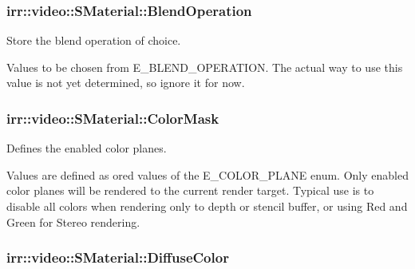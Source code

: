\subsubsection[{\texorpdfstring{Blend\+Operation}{BlendOperation}}]{ irr\+::video\+::\+S\+Material\+::\+Blend\+Operation}\hypertarget{classirr_1_1video_1_1SMaterial_afbef5b333fd3af57649cf11ab575fa26}{}\label{classirr_1_1video_1_1SMaterial_afbef5b333fd3af57649cf11ab575fa26}


Store the blend operation of choice. 

Values to be chosen from E\+\_\+\+B\+L\+E\+N\+D\+\_\+\+O\+P\+E\+R\+A\+T\+I\+ON. The actual way to use this value is not yet determined, so ignore it for now. 
\subsubsection[{\texorpdfstring{Color\+Mask}{ColorMask}}]{ irr\+::video\+::\+S\+Material\+::\+Color\+Mask}\hypertarget{classirr_1_1video_1_1SMaterial_a5a4833b515b453c592224d89356dbc01}{}\label{classirr_1_1video_1_1SMaterial_a5a4833b515b453c592224d89356dbc01}


Defines the enabled color planes. 

Values are defined as or\textquotesingle{}ed values of the E\+\_\+\+C\+O\+L\+O\+R\+\_\+\+P\+L\+A\+NE enum. Only enabled color planes will be rendered to the current render target. Typical use is to disable all colors when rendering only to depth or stencil buffer, or using Red and Green for Stereo rendering. 
\subsubsection[{\texorpdfstring{Diffuse\+Color}{DiffuseColor}}]{ irr\+::video\+::\+S\+Material\+::\+Diffuse\+Color}\hypertarget{classirr_1_1video_1_1SMaterial_ac4e1aaf4751f7267eaf255496cc058df}{}\label{classirr_1_1video_1_1SMaterial_ac4e1aaf4751f7267eaf255496cc058df}


